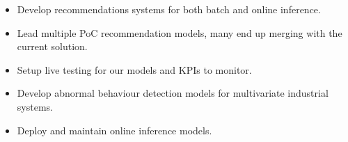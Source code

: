 \documentclass[10pt,a4paper,ragged2e]{texfiles/altacv}
\begin{document}

\begin{fullwidth}
\makecvheader
\end{fullwidth}




\begin{itemize}
    \item Develop recommendations systems for both batch and online inference.
    \item Lead multiple PoC recommendation models, many end up merging with the current solution.
    \item Setup live testing for our models and KPIs to monitor.
\end{itemize}

\vspace{10px}

\begin{itemize}
    \item Develop abnormal behaviour detection models for multivariate industrial systems.
    \item Deploy and maintain online inference models.
\end{itemize}
\end{document}
